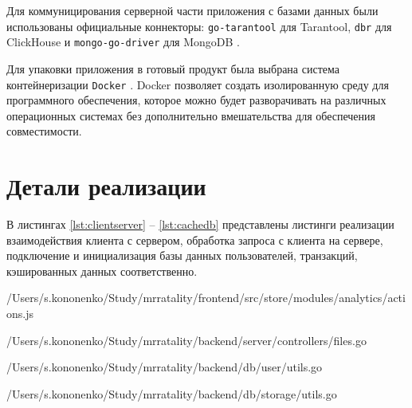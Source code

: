 Для коммуницирования серверной части приложения с базами данных были использованы официальные коннекторы: \texttt{go-tarantool} для Tarantool, \texttt{dbr} для ClickHouse и \texttt{mongo-go-driver} для MongoDB \cite{gotnt} \cite{goch} \cite{gomongo}.

Для упаковки приложения в готовый продукт была выбрана система контейнеризации \texttt{Docker} \cite{docker}. Docker позволяет создать изолированную среду для программного обеспечения, которое можно будет разворачивать на различных операционных системах без дополнительно вмешательства для обеспечения совместимости.

\section{Детали реализации}

В листингах \ref{lst:clientserver} -- \ref{lst:cachedb} представлены листинги реализации взаимодействия клиента с сервером, обработка запроса с клиента на сервере, подключение и инициализация базы данных пользователей, транзакций, кэшированных данных соответственно.

\begin{lstinputlisting}[
	caption={Пример реализации взаимодействия клиента с сервером},
	label={lst:clientserver},
	style={ES6},
	linerange={2-18},
	]{/Users/s.kononenko/Study/mrratality/frontend/src/store/modules/analytics/actions.js}
\end{lstinputlisting}

\begin{lstinputlisting}[
	caption={Пример реализации обработки запроса клиента на сервере},
	label={lst:serverclient},
	style={go},
	linerange={72-153},
	]{/Users/s.kononenko/Study/mrratality/backend/server/controllers/files.go}
\end{lstinputlisting}

\begin{lstinputlisting}[
	caption={Инициализация базы данных пользователей},
	label={lst:userdb},
	style={go},
	linerange={26-47},
	]{/Users/s.kononenko/Study/mrratality/backend/db/user/utils.go}
\end{lstinputlisting}

\begin{lstinputlisting}[
	caption={Инициализация базы данных транзакций},
	label={lst:storagedb},
	style={go},
	linerange={16-34,67-94},
	]{/Users/s.kononenko/Study/mrratality/backend/db/storage/utils.go}
\end{lstinputlisting}

